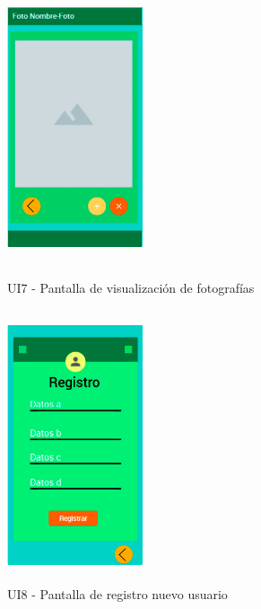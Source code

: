 \begin{figure}[h!]
	\begin{minipage}{0.48\textwidth}
		\centering
		\includegraphics[width=4cm,height=8cm]{imagenes/Anexos/Mockup/7-Foto.png}
		\caption{UI7 - Pantalla de visualización de fotografías}
		\label{fig:analogo}
	\end{minipage}\hfill
	\begin{minipage}{0.48\textwidth}
		\centering
		\includegraphics[width=4cm,height=8cm]{imagenes/Anexos/Mockup/8-Registro.png}
		\caption{UI8 - Pantalla de registro nuevo usuario}
		\label{fig:analogo}
	\end{minipage}\hfill
\end{figure}

